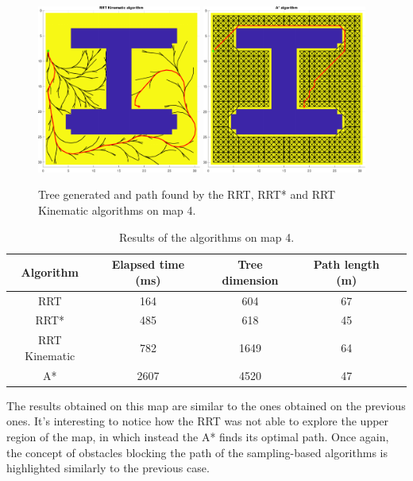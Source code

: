 \begin{figure}[H]
    \includegraphics[width=0.48\textwidth]{./img/MATLAB/testing/04_RRT Kinematic.pdf}
    \hspace{6pt}
    \includegraphics[width=0.48\textwidth]{./img/MATLAB/testing/04_A.pdf}
    \caption{Tree generated and path found by the RRT, RRT* and RRT Kinematic algorithms on map 4.}
    \label{fig:map_4_results}
\end{figure}

\begin{table}[H]
    \centering
    \begin{tabular}{|c|c|c|c|c|}
        \hline
        \textbf{Algorithm} & \textbf{Elapsed time (ms)} & \textbf{Tree dimension} & \textbf{Path length (m)} \\
        \hline
        RRT                & 164                        & 604                     & 67                       \\
        RRT*               & 485                        & 618                     & 45                       \\
        RRT Kinematic      & 782                        & 1649                    & 64                       \\
        \hline
        A*                 & 2607                       & 4520                    & 47                       \\
        \hline
    \end{tabular}
    \caption{Results of the algorithms on map 4.}
    \label{tab:map_4_results}
\end{table}

The results obtained on this map are similar to the ones obtained on the previous ones.
It's interesting to notice how the RRT was not able to explore the upper region of the map, in which instead the A* finds its optimal path.
Once again, the concept of obstacles blocking the path of the sampling-based algorithms is highlighted similarly to the previous case.